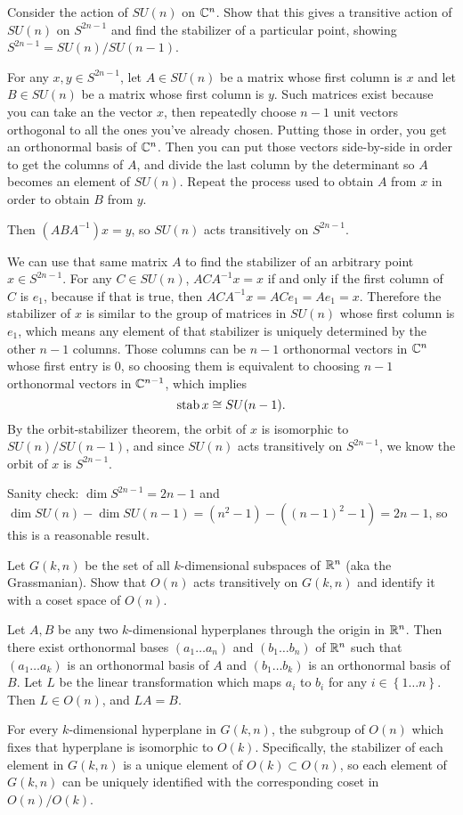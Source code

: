 \documentclass{article}
\begin{document}
\bigskip
\begin{prob}
    Consider the action of $SU(n)$ on $\mathbb{C}^n$. Show that this gives a transitive action of $SU(n)$ on $S^{2n-1}$ and find the stabilizer of a particular point, showing $S^{2n-1}=SU(n)/SU(n-1)$.
\end{prob}
For any $x, y \in S^{2n-1}$, let $A\in SU(n)$ be a matrix whose first column is $x$ and let $B \in SU(n)$ be a matrix whose first column is $y$. Such matrices exist because you can take an the vector $x$, then repeatedly choose $n-1$ unit vectors orthogonal to all the ones you've already chosen. Putting those in order, you get an orthonormal basis of $\mathbb{C}^n$. Then you can put those vectors side-by-side in order to get the columns of $A$, and divide the last column by the determinant so $A$ becomes an element of $SU(n)$. Repeat the process used to obtain $A$ from $x$ in order to obtain $B$ from $y$.
\par
Then $(ABA^{-1})x=y$, so $SU(n)$ acts transitively on $S^{2n-1}$.
\par
We can use that same matrix $A$ to find the stabilizer of an arbitrary point $x \in S^{2n-1}$. For any $C \in SU(n)$, $ACA^{-1}x=x$ if and only if the first column of $C$ is $e_1$, because if that is true, then $ACA^{-1}x=ACe_1=Ae_1=x$. Therefore the stabilizer of $x$ is similar to the group of matrices in $SU(n)$ whose first column is $e_1$, which means any element of that stabilizer is uniquely determined by the other $n-1$ columns. Those columns can be $n-1$ orthonormal vectors in $\mathbb{C}^n$ whose first entry is 0, so choosing them is equivalent to choosing $n-1$ orthonormal vectors in $\mathbb{C}^{n-1}$, which implies
\[ \operatorname{stab} x \cong SU(n-1). \]
By the orbit-stabilizer theorem, the orbit of $x$ is isomorphic to $SU(n)/SU(n-1)$, and since $SU(n)$ acts transitively on $S^{2n-1}$, we know the orbit of $x$ is $S^{2n-1}$.

\begin{note}
    Sanity check: $\dim S^{2n-1}=2n-1$ and $\dim SU(n) - \dim SU(n-1) = (n^2-1)-((n-1)^2-1)=2n-1$, so this is a reasonable result.
\end{note}

\bigskip
\begin{prob}
    Let $G(k,n)$ be the set of all $k$-dimensional subspaces of $\mathbb{R}^n$ (aka the Grassmanian). Show that $O(n)$ acts transitively on $G(k,n)$ and identify it with a coset space of $O(n)$.
\end{prob}
Let $A,B$ be any two $k$-dimensional hyperplanes through the origin in $\mathbb{R}^n$. Then there exist orthonormal bases $(a_1 \dots a_n)$ and $(b_1 \dots b_n)$ of $\mathbb{R}^n$ such that $(a_1 \dots a_k)$ is an orthonormal basis of $A$ and $(b_1 \dots b_k)$ is an orthonormal basis of $B$. Let $L$ be the linear transformation which maps $a_i$ to $b_i$ for any $i \in \left\{ 1 \dots n \right\}$. Then $L \in O(n)$, and $LA=B$.
\par
For every $k$-dimensional hyperplane in $G(k,n)$, the subgroup of $O(n)$ which fixes that hyperplane is isomorphic to $O(k)$. Specifically, the stabilizer of each element in $G(k,n)$ is a unique element of $O(k) \subset O(n)$, so each element of $G(k,n)$ can be uniquely identified with the corresponding coset in $O(n)/O(k)$.
\end{document}
